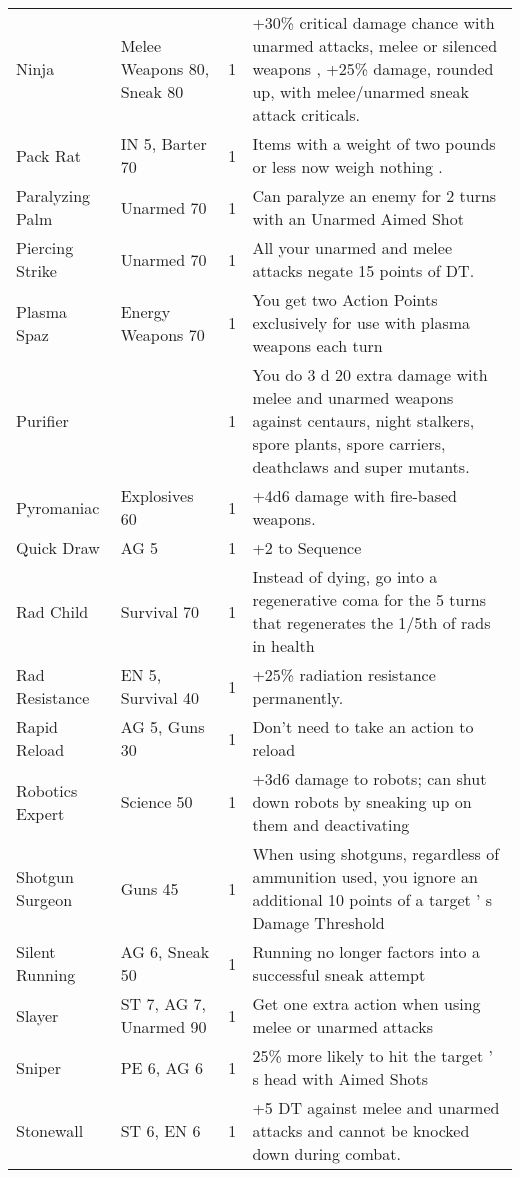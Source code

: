 \begin{longtable}{|p{3.3cm}|p{3.1cm}|p{1.2cm}|p{8.4cm}|}
Ninja  & Melee Weapons 80, Sneak 80  & 1  & +30\% critical damage chance with unarmed attacks, melee or silenced weapons , +25\% damage,  rounded up,  with melee/unarmed sneak attack criticals.  \\
Pack Rat  & IN 5, Barter 70  & 1  & Items with a weight of two pounds or less now weigh  nothing .  \\
Paralyzing Palm  & Unarmed 70  & 1  & Can paralyze an enemy for  2 turns  with  an Unarmed Aimed Shot \\
Piercing Strike  & Unarmed 70  & 1  & All your unarmed and melee attacks negate 15 points of DT.  \\
Plasma Spaz  & Energy Weapons 70  & 1  & You get  two Action Points exclusively for use with  plasma weapons  each turn \\
Purifier  &  & 1  & You do  3 d 20  extra damage with melee and unarmed weapons against centaurs, night stalkers, spore plants, spore carriers, deathclaws and super mutants.  \\
Pyromaniac  & Explosives 60  & 1  & +4d6  damage with fire-based weapons.  \\
Quick Draw  & AG 5  & 1  & +2 to Sequence \\
Rad Child  & Survival 70  & 1  & Instead of dying, go into a regenerative coma for the 5 turns that regenerates the 1/5th of rads in  health \\
Rad Resistance  & EN 5, Survival 40  & 1  & +25\% radiation resistance permanently.  \\
Rapid Reload  & AG 5, Guns 30  & 1  & Don’t need to take an action to reload \\
Robotics Expert  & Science 50  & 1  & +3d6  damage to robots; can shut down robots by sneaking up on them and deactivating \\
Shotgun Surgeon  & Guns 45  & 1  & When using shotguns, regardless of ammunition used, you ignore an additional 10 points of a target ' s Damage Threshold \\
Silent Running  & AG 6, Sneak 50  & 1  & Running no longer factors into a successful sneak attempt  \\
Slayer  & ST 7, AG 7, Unarmed 90  & 1  & Get one extra action when using melee or unarmed attacks \\
Sniper  & PE 6, AG 6  & 1  & 25\% more likely to hit the target ' s head  with Aimed Shots \\
Stonewall  & ST 6, EN 6  & 1  & +5 DT against melee and unarmed attacks and cannot be knocked down during combat.  \\

\end{longtable}
